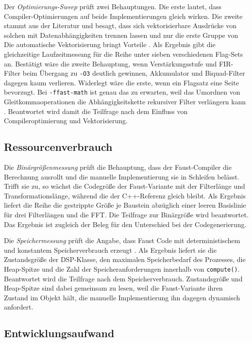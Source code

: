 Der \emph{Optimierungs-Sweep} prüft zwei Behauptungen. Die erste lautet, dass Compiler-Optimierungen auf beide Implementierungen gleich wirken. Die zweite stammt aus der Literatur und besagt, dass sich vektorisierbare Ausdrücke von solchen mit Datenabhängigkeiten trennen lassen und nur die erste Gruppe von Die automatische Vektorisierung bringt Vorteile \parencite{scaringella:hal-02158949}. Als Ergebnis gibt die gleichzeitige Laufzeitmessung für die Reihe unter sieben verschiedenen Flag-Sets an. Bestätigt wäre die zweite Behauptung, wenn Verstärkungsstufe und FIR-Filter beim Übergang zu \texttt{-O3} deutlich gewinnen, Akkumulator und Biquad-Filter dagegen kaum verlieren. Widerlegt wäre die erste, wenn ein Flagsatz eine Seite bevorzugt. Bei \texttt{-ffast-math} ist genau das zu erwarten, weil das Umordnen von Gleitkommaoperationen die Abhängigkeitskette rekursiver Filter verlängern kann \parencite{parhi1999vlsi}. Beantwortet wird damit die Teilfrage nach dem Einfluss von Compileroptimierung und Vektorisierung.

\subsection{Ressourcenverbrauch}

Die \emph{Binärgrößenmessung} prüft die Behauptung, dass der Faust-Compiler die Berechnung ausrollt und die manuelle Implementierung sie in Schleifen
belässt. Trifft sie zu, so wächst die Codegröße der Faust-Variante mit der
Filterlänge und Transformationslänge, während die der C++-Referenz gleich
bleibt. Als Ergebnis liefert die Reihe die gestrippte Größe je Baustein
abzüglich einer leeren Basislinie für drei Filterlängen und die FFT.
Die Teilfrage zur Binärgröße wird beantwortet. Das Ergebnis ist zugleich der Beleg für den Unterschied bei der Codegenerierung.

Die \emph{Speichermessung} prüft die Angabe, dass Faust Code mit
deterministischem und konstantem Speicherverbrauch erzeugt
\parencite{orlarey:hal-02159014}. Als Ergebnis liefert sie die Zustandsgröße der
DSP-Klasse, den maximalen Speicherbedarf des Prozesses, die Heap-Spitze und
die Zahl der Speicheranforderungen innerhalb von \texttt{compute()}. Beantwortet wird die Teilfrage nach dem Speicherverbrauch. Zustandsgröße und Heap-Spitze sind dabei gemeinsam zu lesen, weil die Faust-Variante ihren Zustand im Objekt hält, die manuelle Implementierung ihn dagegen dynamisch anfordert.

\subsection{Entwicklungsaufwand}

